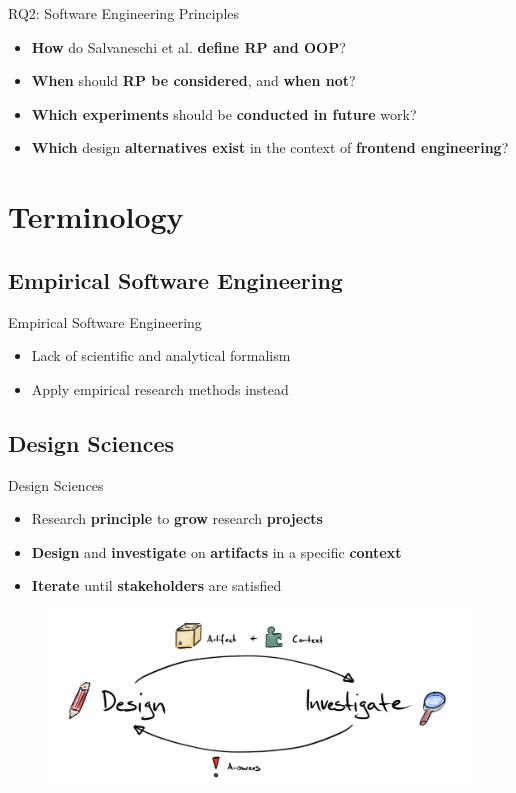 \documentclass{beamer}
\begin{document}
\begin{frame}{RQ2: Software Engineering Principles}
	\begin{itemize}
		\item[RQ2.1] \textbf{How} do Salvaneschi et al. \cite{7827078} \textbf{define RP and OOP}?\bigskip
		\item[RQ2.2] \textbf{When} should \textbf{RP be considered}, and \textbf{when not}?\bigskip
		\item[RQ2.3] \textbf{Which experiments} should be \textbf{conducted in future} work?\bigskip
		\item[RQ2.4] \textbf{Which} design \textbf{alternatives exist} in the context of \textbf{frontend engineering}?
	\end{itemize}
\end{frame}


\section{Terminology}
\subsection*{Empirical Software Engineering}
\begin{frame}{Empirical Software Engineering}
	\begin{itemize}
		\item Lack of scientific and analytical formalism\bigskip
		\item Apply empirical research methods instead
	\end{itemize}
\end{frame}

\subsection*{Design Sciences}
\begin{frame}{Design Sciences \cite{wieringa}}
	\begin{itemize}
		\item Research \textbf{principle} to \textbf{grow} research \textbf{projects}\bigskip
		\item \textbf{Design} and \textbf{investigate} on \textbf{artifacts} in a specific \textbf{context}\bigskip
		\item \textbf{Iterate} until \textbf{stakeholders} are satisfied
	\end{itemize}

	\begin{figure}
		\includegraphics[width=.8\textwidth]{assets/slides/design-sciences-process.png}
	\end{figure}
\end{frame}
\end{document}
